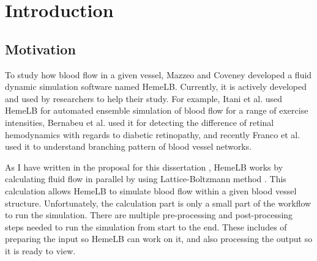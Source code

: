  

\chapter[Introduction]{Introduction}



%


\section{Motivation}
To study how blood flow in a given vessel, Mazzeo and Coveney\cite{mazzeo2008hemelb} developed a fluid dynamic simulation software named HemeLB. Currently, it is actively developed and used by researchers to help their study. For example, Itani et al.\cite{itani2015automated} used HemeLB for automated ensemble simulation of blood flow for a range of exercise intensities,  Bernabeu et al.\cite{bernabeu2015characterization} used it for detecting the difference of retinal hemodynamics with regards to diabetic retinopathy, and recently Franco et al.\cite{franco2015dynamic,franco2016non} used it to understand branching pattern of blood vessel networks.

As I have written in the proposal for this dissertation \citep{Steven:2016aa}, HemeLB works by calculating fluid flow in parallel by using Lattice-Boltzmann method \citep{mazzeo2008hemelb}. This calculation allows HemeLB to simulate blood flow within a given blood vessel structure. Unfortunately, the calculation part is only a small part of the workflow to run the simulation. There are multiple pre-processing and post-processing steps needed to run the simulation from start to the end. These includes of preparing the input so HemeLB can work on it, and also processing the output so it is ready to view.

